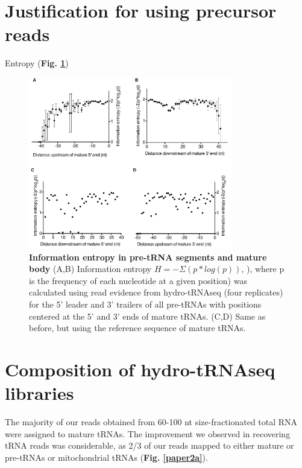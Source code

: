 \documentclass[12pt]{rockefeller}
\begin{document}
\section{Justification for using precursor reads}

Entropy (\textbf{Fig. \ref{supp1}})

\begin{figure}[!ht]%
\centering
\includegraphics[width=3.5in]{supp1.png}%
\caption[Information entropy in pre-tRNA segments and mature body]{\textbf{Information entropy in pre-tRNA segments and mature body}
(A,B) Information entropy $H = -\Sigma(p*log(p))$, ), where p is the frequency of each nucleotide at a given position) was calculated using read evidence from hydro-tRNAseq (four replicates) for the 5’ leader and 3’ trailers of all pre-tRNAs with positions centered at the 5’ and 3’ ends of mature tRNAs. (C,D) Same as before, but using the reference sequence of mature tRNAs.}
\centering
\label{supp1}%
\end{figure}

\section{Composition of hydro-tRNAseq libraries}
The majority of our reads obtained from 60-100 nt size-fractionated total RNA were assigned to mature tRNAs.
The improvement we observed in recovering tRNA reads was considerable, as 2/3 of our reads mapped to either mature or pre-tRNAs or mitochondrial tRNAs (\textbf{Fig. \ref{paper2a}}). 
\end{document}
